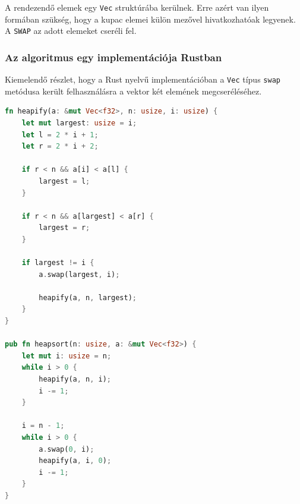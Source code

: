 A rendezendő elemek egy \lstinline{Vec} struktúrába kerülnek. Erre azért van ilyen formában szükség, hogy a kupac elemei külön mezővel hivatkozhatóak legyenek. A \lstinline{SWAP} az adott elemeket cseréli fel.

\subsubsection{Az algoritmus egy implementációja Rustban}

Kiemelendő részlet, hogy a Rust nyelvű implementációban a \lstinline{Vec} típus \lstinline{swap} metódusa került felhasználásra a vektor két elemének megcseréléséhez.
\begin{lstlisting}[language=Rust]
fn heapify(a: &mut Vec<f32>, n: usize, i: usize) {
    let mut largest: usize = i;
    let l = 2 * i + 1;
    let r = 2 * i + 2;

    if r < n && a[i] < a[l] {
        largest = l;
    }

    if r < n && a[largest] < a[r] {
        largest = r;
    }

    if largest != i {
        a.swap(largest, i);

        heapify(a, n, largest);
    }
}

pub fn heapsort(n: usize, a: &mut Vec<f32>) {
    let mut i: usize = n;
    while i > 0 {
        heapify(a, n, i);
        i -= 1;
    }

    i = n - 1;
    while i > 0 {
        a.swap(0, i);
        heapify(a, i, 0);
        i -= 1;
    }
}
\end{lstlisting}

